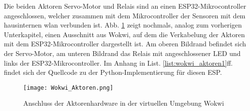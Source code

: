 Die beiden Aktoren Servo-Motor und Relais sind an einen ESP32-Mikrocontroller angeschlossen, welcher zusammen mit dem Mikrocontroller der Sensoren mit dem hausinternen \gls{wlan} verbunden ist. Abb. \ref{fig:wokwi_aktoren} zeigt nochmals, analog zum vorherigen Unterkapitel, einen Ausschnitt aus Wokwi, auf dem die Verkabelung der Aktoren mit dem ESP32-Mikrocontroller dargestellt ist. Am oberen Bildrand befindet sich der Servo-Motor, am unteren Bildrand das Relais mit angeschlossener LED und links der ESP32-Mikrocontroller. Im Anhang in List. \ref{list:wokwi_aktoren1}ff. findet sich der Quellcode zu der Python-Implementierung für diesen ESP.

\begin{figure}[h]
    \centering
    \texttt{[image: Wokwi\_Aktoren.png]}
    \caption{Anschluss der Aktorenhardware in der virtuellen Umgebung Wokwi}\label{fig:wokwi_aktoren}
\end{figure}